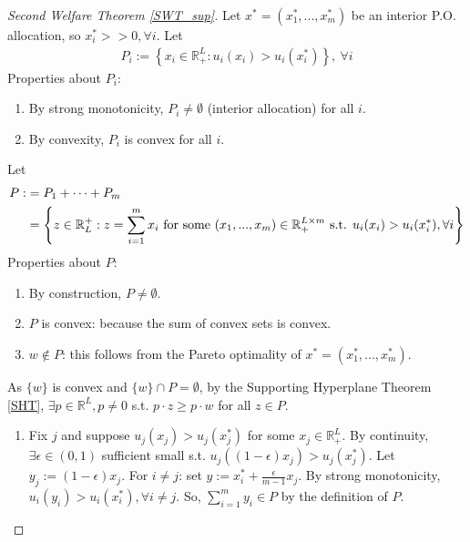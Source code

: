 \documentclass[11pt]{elegantbook}
\begin{document}
\begin{proof}[Second Welfare Theorem \ref{SWT_sup}]
    Let $x^*=\left(x_1^*,...,x_m^*\right)$ be an interior P.O. allocation, so $x_i^*>>0, \forall i$. Let
    \begin{equation}
        \begin{aligned}
            P_i:=\left\{x_i\in \mathbb{R}_+^L:u_i(x_i)> u_i(x_i^*)\right\}, \ \forall i
        \end{aligned}
        \nonumber
    \end{equation}
    Properties about $P_i$:
    \begin{enumerate}[(1).]
        \item By strong monotonicity, $P_i\neq \emptyset$ (interior allocation) for all $i$.
        \item By convexity, $P_i$ is convex for all $i$.
    \end{enumerate}
    Let
    \begin{equation}
        \begin{aligned}
            P:&=P_1+\cdots+P_m\\
            &=\left\{z\in \mathbb{R}_L^+: z=\sum_{i=1}^m x_i \textnormal{ for some }(x_1,...,x_m)\in \mathbb{R}_+^{L\times m} \textnormal{ s.t. }u_i(x_i)> u_i(x_i^*), \forall i\right\}
        \end{aligned}
        \nonumber
    \end{equation}
    Properties about $P$:
    \begin{enumerate}[(1).]
        \item By construction, $P\neq \emptyset$.
        \item $P$ is convex: because the sum of convex sets is convex.
        \item $w\notin P$: this follows from the Pareto optimality of $x^*=\left(x_1^*,...,x_m^*\right)$.
    \end{enumerate}
    As $\{w\}$ is convex and $\{w\}\cap P=\emptyset$, by the Supporting Hyperplane Theorem \ref{SHT}, $\exists p\in \mathbb{R}^L, p\neq 0$ s.t.  $p\cdot z\geq p\cdot w$ for all $z\in P$.
    \begin{enumerate}[$\circ$]
        \item
            \subitem Fix $j$ and suppose $u_j(x_j)>u_j(x_j^*)$ for some $x_j\in \mathbb{R}_+^L$. By continuity, $\exists \epsilon\in (0,1)$ sufficient small s.t. $u_j((1-\epsilon)x_j)>u_j(x_j^*)$. Let $y_j:=(1-\epsilon)x_j$. For $i\neq j$: set $y:=x_i^*+\frac{\epsilon}{m-1}x_j$. By strong monotonicity, $u_i(y_i)>u_i(x_i^*), \forall i\neq j$. So, $\sum_{i=1}^m y_i\in P$ by the definition of $P$.\\

\end{enumerate}
\end{proof}
\end{document}

